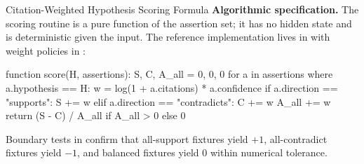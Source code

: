 \documentclass[
  ignorenonframetext,
]{beamer}
\newenvironment{Shaded}{}{}
\newcommand{\NormalTok}[1]{#1}
\begin{document}
\begin{frame}{Citation-Weighted Hypothesis
Scoring Formula \label{sec:appendix_scoring}}
\textbf{Algorithmic specification.} The scoring routine is a pure
function of the assertion set; it has no hidden state and is
deterministic given the input. The reference implementation lives in
 with weight policies in
:

\begin{Shaded}
\begin{Highlighting}[]
\NormalTok{function score(H, assertions):}
\NormalTok{    S, C, A\_all = 0, 0, 0}
\NormalTok{    for a in assertions where a.hypothesis == H:}
\NormalTok{        w = log(1 + a.citations) * a.confidence}
\NormalTok{        if a.direction == "supports":     S     += w}
\NormalTok{        elif a.direction == "contradicts": C     += w}
\NormalTok{        A\_all += w}
\NormalTok{    return (S {-} C) / A\_all  if A\_all \textgreater{} 0  else 0}
\end{Highlighting}
\end{Shaded}

Boundary tests in  confirm that
all-support fixtures yield \(+1\), all-contradict fixtures yield \(-1\),
and balanced fixtures yield \(0\) within numerical tolerance.

\FloatBarrier
\end{frame}
\end{document}
